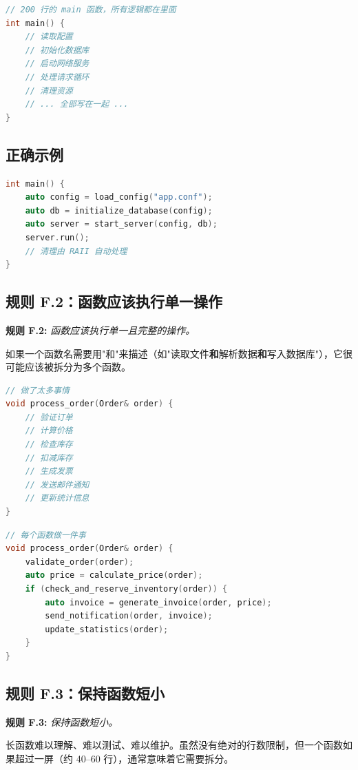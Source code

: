 \begin{lstlisting}[language=C++]
// 200 行的 main 函数，所有逻辑都在里面
int main() {
    // 读取配置
    // 初始化数据库
    // 启动网络服务
    // 处理请求循环
    // 清理资源
    // ... 全部写在一起 ...
}
\end{lstlisting}

\subsection{正确示例}

\begin{lstlisting}[language=C++]
int main() {
    auto config = load_config("app.conf");
    auto db = initialize_database(config);
    auto server = start_server(config, db);
    server.run();
    // 清理由 RAII 自动处理
}
\end{lstlisting}

\subsection{规则 F.2：函数应该执行单一操作}

\textbf{规则 F.2:} \textit{函数应该执行单一且完整的操作。}

如果一个函数名需要用"和"来描述（如"读取文件\textbf{和}解析数据\textbf{和}写入数据库"），它很可能应该被拆分为多个函数。

\begin{lstlisting}[language=C++]
// 做了太多事情
void process_order(Order& order) {
    // 验证订单
    // 计算价格
    // 检查库存
    // 扣减库存
    // 生成发票
    // 发送邮件通知
    // 更新统计信息
}
\end{lstlisting}

\begin{lstlisting}[language=C++]
// 每个函数做一件事
void process_order(Order& order) {
    validate_order(order);
    auto price = calculate_price(order);
    if (check_and_reserve_inventory(order)) {
        auto invoice = generate_invoice(order, price);
        send_notification(order, invoice);
        update_statistics(order);
    }
}
\end{lstlisting}

\subsection{规则 F.3：保持函数短小}

\textbf{规则 F.3:} \textit{保持函数短小。}

长函数难以理解、难以测试、难以维护。虽然没有绝对的行数限制，但一个函数如果超过一屏（约 40--60 行），通常意味着它需要拆分。

